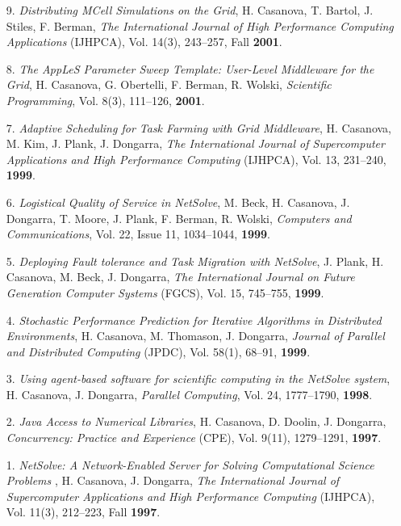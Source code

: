 \begin{enumerate}
\item[9.]
{\it Distributing MCell Simulations on the Grid}, H. Casanova, T. Bartol,
J. Stiles, F. Berman, \emph{The International Journal of High Performance
Computing Applications} (IJHPCA), Vol. 14(3), 243--257, Fall {\bf 2001}.

\item[8.]
{\it The AppLeS Parameter Sweep Template: User-Level Middleware for the
Grid}, H. Casanova, G. Obertelli, F. Berman, R. Wolski, \emph{Scientific
Programming}, Vol. 8(3), 111--126, {\bf 2001}.  

\item[7.]
{\it Adaptive Scheduling for Task Farming with Grid Middleware},
H. Casanova, M. Kim, J. Plank, J. Dongarra, \emph{The International
Journal of Supercomputer Applications and High Performance Computing}
(IJHPCA), Vol. 13, 231--240, {\bf 1999}.

\item[6.]
{\it Logistical Quality of Service in NetSolve}, M. Beck, H. Casanova,
J. Dongarra, T. Moore, J. Plank, F. Berman, R. Wolski, \emph{Computers
and Communications}, Vol. 22, Issue 11, 1034--1044, {\bf 1999}.

\item[5.]
{\it Deploying Fault tolerance and Task Migration with NetSolve},
J. Plank, H. Casanova, M. Beck, J. Dongarra, \emph{The International
Journal on Future Generation Computer Systems} (FGCS), Vol. 15, 745--755,
{\bf 1999}.

\item[4.]
{\it Stochastic Performance Prediction for Iterative Algorithms in
Distributed Environments}, H. Casanova, M. Thomason, J. Dongarra,
\emph{Journal of Parallel and Distributed Computing} (JPDC), Vol. 58(1),
68--91, {\bf 1999}.

\item[3.]
{\it Using agent-based software for scientific computing in the NetSolve
system}, H. Casanova, J. Dongarra, \emph{Parallel Computing}, Vol. 24,
1777--1790, {\bf 1998}.

\item[2.]
{\it Java Access to Numerical Libraries}, H. Casanova, D. Doolin,
J. Dongarra, \emph{Concurrency: Practice and Experience} (CPE), Vol. 9(11),
1279--1291, {\bf 1997}.

\item[1.]
{\it NetSolve: A Network-Enabled Server for Solving Computational
Science Problems }, H. Casanova, J. Dongarra, {\em The International
Journal of Supercomputer Applications and High Performance Computing}
(IJHPCA), Vol. 11(3), 212--223, Fall {\bf 1997}. 

\end{enumerate}


